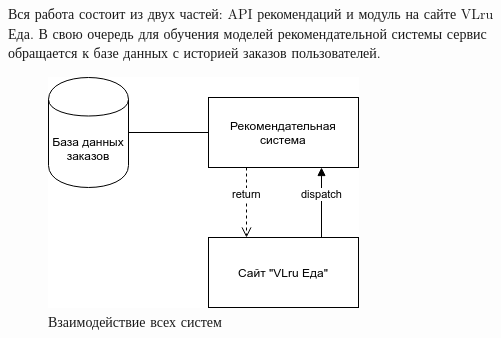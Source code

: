 Вся работа состоит из двух частей: API рекомендаций и модуль на сайте VLru Еда.
В свою очередь для обучения моделей рекомендательной системы сервис обращается к
базе данных с историей заказов пользователей.
\begin{figure}[H]
  \centering
  \includegraphics[scale=0.8]{images/sub_modules.png}
  \caption{Взаимодействие всех систем}
\end{figure}
